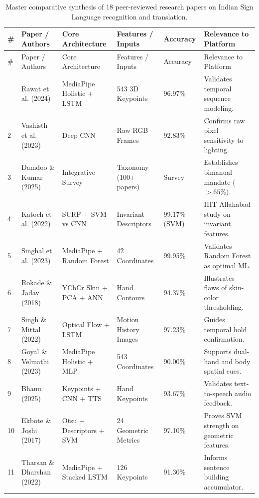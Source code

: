 \begin{longtable}{p{}p{}p{}p{}p{}p{}}
\caption{Master comparative synthesis of 18 peer-reviewed research papers on Indian Sign Language recognition and translation.}\label{tab:master-literature}\\
\toprule
\# & Paper / Authors & Core Architecture & Features / Inputs & Accuracy & Relevance to Platform\\\midrule
\endfirsthead
\toprule
\# & Paper / Authors & Core Architecture & Features / Inputs & Accuracy & Relevance to Platform\\\midrule
\endhead
\bottomrule
\endfoot
1 & Rawat et al. (2024) \cite{rawat2024} & MediaPipe Holistic + LSTM & 543 3D Keypoints & 96.97\% & Validates temporal sequence modeling.\\
2 & Vashisth et al. (2023) \cite{vashisth2023} & Deep CNN & Raw RGB Frames & 92.83\% & Confirms raw pixel sensitivity to lighting.\\
3 & Damdoo \& Kumar (2025) \cite{damdoo2025} & Integrative Survey & Taxonomy (100+ papers) & Survey & Establishes bimanual mandate ($>65\%$).\\
4 & Katoch et al. (2022) \cite{katoch2022} & SURF + SVM vs CNN & Invariant Descriptors & 99.17\% (SVM) & IIIT Allahabad study on invariant features.\\
5 & Singhal et al. (2023) \cite{singhal2023} & MediaPipe + Random Forest & 42 Coordinates & 99.95\% & Validates Random Forest as optimal ML.\\
6 & Rokade \& Jadav (2018) \cite{rokade2018} & YCbCr Skin + PCA + ANN & Hand Contours & 94.37\% & Illustrates flaws of skin-color thresholding.\\
7 & Singh \& Mittal (2022) \cite{singh2022} & Optical Flow + LSTM & Motion History Images & 97.23\% & Guides temporal hold confirmation.\\
8 & Goyal \& Velmathi (2023) \cite{goyal2023} & MediaPipe Holistic + MLP & 543 Coordinates & 90.00\% & Supports dual-hand and body spatial cues.\\
9 & Bhanu (2025) \cite{bhanu2025} & Keypoints + CNN + TTS & Hand Keypoints & 93.67\% & Validates text-to-speech audio feedback.\\
10 & Ekbote \& Joshi (2017) \cite{ekbote2017} & Otsu + Descriptors + SVM & 24 Geometric Metrics & 97.10\% & Proves SVM strength on geometric features.\\
11 & Tharsan \& Dharshan (2022) \cite{tharsan2022} & MediaPipe + Stacked LSTM & 126 Keypoints & 91.30\% & Informs sentence building accumulator.\\

\end{longtable}
